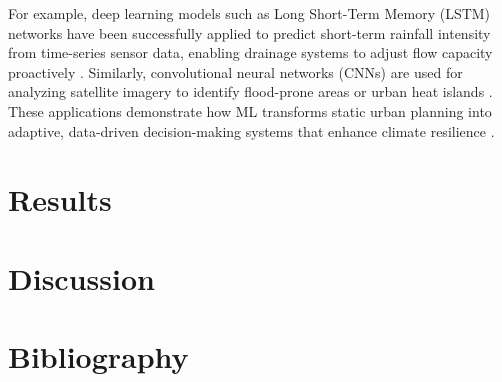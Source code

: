 \documentclass[12pt]{article}
\begin{document}
For example, deep learning models such as Long Short-Term Memory (LSTM) networks have been successfully applied to predict short-term rainfall intensity from time-series sensor data, enabling drainage systems to adjust flow capacity proactively \cite{kratzert2019towards}. 
Similarly, convolutional neural networks (CNNs) are used for analyzing satellite imagery to identify flood-prone areas or urban heat islands \cite{rolnick2022tackling}. 
These applications demonstrate how ML transforms static urban planning into adaptive, data-driven decision-making systems that enhance climate resilience \cite{mohanty2020ai,li2021sponge}.


\section{Results}
\lipsum[6-7]  %

\section{Discussion}
\lipsum[8-9]  %

\section{Bibliography}
\printbibliography[heading=none]

\end{document}

